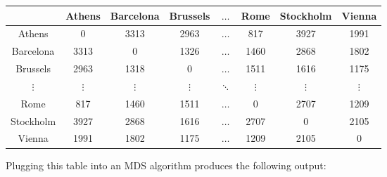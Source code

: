 \begin{center}
  \begin{tabular}{c|ccccccc}
  &  Athens & Barcelona & Brussels & $\ldots$ & Rome & Stockholm & Vienna \\ \hline
Athens & 0 & 3313 & 2963 & $\ldots$ & 817 & 3927 & 1991 \\
Barcelona & 3313 & 0 & 1326 & $\ldots$ & 1460 & 2868 & 1802 \\
Brussels & 2963 & 1318 & 0 & $\ldots$ & 1511 & 1616 & 1175 \\
$\vdots$ & $\vdots$ & $\vdots$ & $\vdots$ & $\ddots$ &
$\vdots$  & $\vdots$ & $\vdots$ \\
Rome & 817 & 1460 & 1511 & $\ldots$ & 0 & 2707 & 1209 \\
Stockholm & 3927 & 2868 & 1616 & $\ldots$ & 2707 & 0 & 2105 \\
Vienna & 1991 & 1802 & 1175 & $\ldots$ & 1209 & 2105 & 0 
  \end{tabular}
  \label{tab:eurodist}
\end{center}

Plugging this table into an MDS algorithm produces the following
output:

